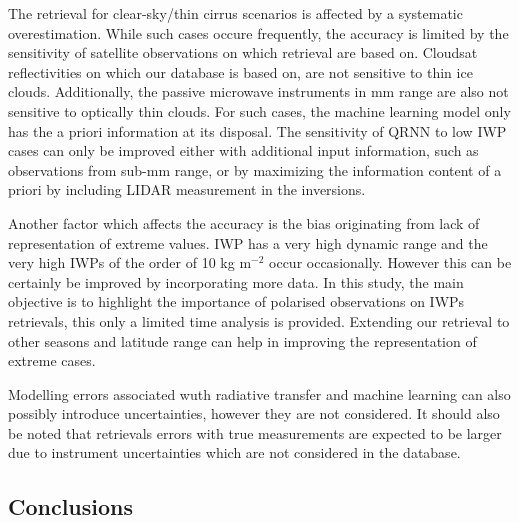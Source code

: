 \documentclass[amt, manuscript]{copernicus}
\begin{document}
The retrieval for clear-sky/thin cirrus scenarios is affected by a systematic overestimation. While such cases occure frequently, the accuracy is limited by the sensitivity of satellite observations on which retrieval are based on. Cloudsat reflectivities on which our database is based on, are not sensitive to thin ice clouds. Additionally, the passive microwave instruments in mm range are also not sensitive to optically thin clouds. For such cases, the machine learning model only has the a priori information at its disposal. The sensitivity of QRNN to low IWP cases can only be improved either with additional input information, such as observations from sub-mm range, or by maximizing the information content of a priori by including LIDAR measurement in the inversions.

Another factor which affects the accuracy is the bias originating from lack of representation of extreme values. IWP has a very high dynamic range and the very high IWPs of the order of 10\,\,kg m$^{-2}$ occur occasionally. However this can be certainly be improved by incorporating more data. In this study, the main objective is to highlight the importance of polarised observations on IWPs retrievals, this only a limited time analysis is provided. Extending our retrieval to other seasons and latitude range can help in improving the representation of extreme cases. 

Modelling errors associated wuth radiative transfer and machine learning can also possibly introduce uncertainties, however they are not considered. 
It should also be noted that retrievals errors with true measurements are expected to be larger due to instrument uncertainties which are not considered in the database. 




\subsection{Conclusions}













\end{document}
